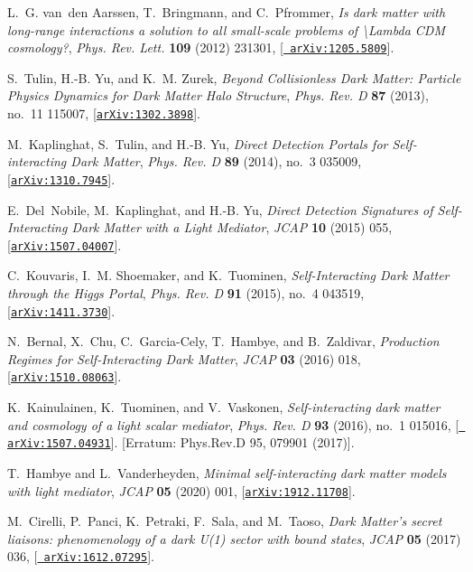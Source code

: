 \documentclass[prd,nofootinbib,preprint,superscriptaddress]{revtex4}
\begin{document}
\begin{thebibliography}{100}
L.~G. van~den Aarssen, T.~Bringmann, and C.~Pfrommer, {\it {Is dark matter with
  long-range interactions a solution to all small-scale problems of
  \textbackslash{}Lambda CDM cosmology?}},  {\em Phys. Rev. Lett.} {\bf 109}
  (2012) 231301, [\href{http://arxiv.org/abs/1205.5809}{{\tt
  arXiv:1205.5809}}].

S.~Tulin, H.-B. Yu, and K.~M. Zurek, {\it {Beyond Collisionless Dark Matter:
  Particle Physics Dynamics for Dark Matter Halo Structure}},  {\em Phys. Rev.
  D} {\bf 87} (2013), no.~11 115007,
  [\href{http://arxiv.org/abs/1302.3898}{{\tt arXiv:1302.3898}}].

M.~Kaplinghat, S.~Tulin, and H.-B. Yu, {\it {Direct Detection Portals for
  Self-interacting Dark Matter}},  {\em Phys. Rev. D} {\bf 89} (2014), no.~3
  035009, [\href{http://arxiv.org/abs/1310.7945}{{\tt arXiv:1310.7945}}].

E.~Del~Nobile, M.~Kaplinghat, and H.-B. Yu, {\it {Direct Detection Signatures
  of Self-Interacting Dark Matter with a Light Mediator}},  {\em JCAP} {\bf 10}
  (2015) 055, [\href{http://arxiv.org/abs/1507.04007}{{\tt arXiv:1507.04007}}].

C.~Kouvaris, I.~M. Shoemaker, and K.~Tuominen, {\it {Self-Interacting Dark
  Matter through the Higgs Portal}},  {\em Phys. Rev. D} {\bf 91} (2015), no.~4
  043519, [\href{http://arxiv.org/abs/1411.3730}{{\tt arXiv:1411.3730}}].

N.~Bernal, X.~Chu, C.~Garcia-Cely, T.~Hambye, and B.~Zaldivar, {\it {Production
  Regimes for Self-Interacting Dark Matter}},  {\em JCAP} {\bf 03} (2016) 018,
  [\href{http://arxiv.org/abs/1510.08063}{{\tt arXiv:1510.08063}}].

K.~Kainulainen, K.~Tuominen, and V.~Vaskonen, {\it {Self-interacting dark
  matter and cosmology of a light scalar mediator}},  {\em Phys. Rev. D} {\bf
  93} (2016), no.~1 015016, [\href{http://arxiv.org/abs/1507.04931}{{\tt
  arXiv:1507.04931}}]. [Erratum: Phys.Rev.D 95, 079901 (2017)].

T.~Hambye and L.~Vanderheyden, {\it {Minimal self-interacting dark matter
  models with light mediator}},  {\em JCAP} {\bf 05} (2020) 001,
  [\href{http://arxiv.org/abs/1912.11708}{{\tt arXiv:1912.11708}}].

M.~Cirelli, P.~Panci, K.~Petraki, F.~Sala, and M.~Taoso, {\it {Dark Matter's
  secret liaisons: phenomenology of a dark U(1) sector with bound states}},
  {\em JCAP} {\bf 05} (2017) 036, [\href{http://arxiv.org/abs/1612.07295}{{\tt
  arXiv:1612.07295}}].


\end{thebibliography}
\end{document}
